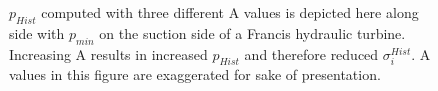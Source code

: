 \begin{figure}[h!]
\begin{minipage}[b]{1\linewidth}
 \centering
\end{minipage}
\caption{$p_{Hist}$ computed with three different A values is depicted here along side with $p_{min}$ on the suction side of a Francis hydraulic turbine. Increasing A results in increased $p_{Hist}$ and therefore reduced $\sigma_i^{Hist}$. A values in this figure are exaggerated for sake of presentation.}
\label{design-cav-histo}
\end{figure}



